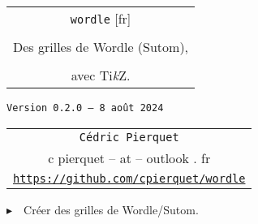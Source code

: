 \documentclass[french,a4paper,11pt]{article}
\def\TPversion{0.2.0}
\def\TPdate{8 août 2024}
\begin{document}
\setlength{\aweboxleftmargin}{0.07\linewidth}
\setlength{\aweboxcontentwidth}{0.93\linewidth}
\setlength{\aweboxvskip}{8pt}

\pagestyle{fancy}

\thispagestyle{empty}

\vspace{2cm}

\begin{center}
	\begin{minipage}{0.75\linewidth}
	\begin{tcolorbox}[colframe=yellow,colback=yellow!15]
		\begin{center}
			\begin{tabular}{c}
				{\Huge \texttt{wordle} [fr]}\\
				\\
				{\LARGE Des grilles de Wordle (Sutom),} \\
				\\
				{\LARGE avec \textsf{Ti\textit{k}Z}.} \\
			\end{tabular}

			\bigskip

			{\small \texttt{Version \TPversion{} -- \TPdate}}
		\end{center}
	\end{tcolorbox}
\end{minipage}
\end{center}

\begin{center}
	\begin{tabular}{c}
	\texttt{Cédric Pierquet}\\
	{\ttfamily c pierquet -- at -- outlook . fr}\\
	\texttt{\url{https://github.com/cpierquet/wordle}}
\end{tabular}
\end{center}

\vspace{0.25cm}

{$\blacktriangleright$~~Créer des grilles de Wordle/Sutom\footnotemark{}.}

\vspace{0.25cm}
\end{document}
